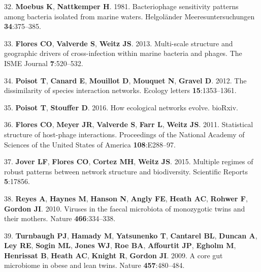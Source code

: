 \documentclass[12pt,]{article}
\begin{document}
\hypertarget{ref-Moebus:1981kp}{}
32. \textbf{Moebus K}, \textbf{Nattkemper H}. 1981. Bacteriophage
sensitivity patterns among bacteria isolated from marine waters.
Helgoländer Meeresuntersuchungen \textbf{34}:375--385.

\hypertarget{ref-Flores:2013hc}{}
33. \textbf{Flores CO}, \textbf{Valverde S}, \textbf{Weitz JS}. 2013.
Multi-scale structure and geographic drivers of cross-infection within
marine bacteria and phages. The ISME Journal \textbf{7}:520--532.

\hypertarget{ref-Poisot:2012fh}{}
34. \textbf{Poisot T}, \textbf{Canard E}, \textbf{Mouillot D},
\textbf{Mouquet N}, \textbf{Gravel D}. 2012. The dissimilarity of
species interaction networks. Ecology letters \textbf{15}:1353--1361.

\hypertarget{ref-Poisot071993}{}
35. \textbf{Poisot T}, \textbf{Stouffer D}. 2016. How ecological
networks evolve. bioRxiv.

\hypertarget{ref-Flores:2011bh}{}
36. \textbf{Flores CO}, \textbf{Meyer JR}, \textbf{Valverde S},
\textbf{Farr L}, \textbf{Weitz JS}. 2011. Statistical structure of
host-phage interactions. Proceedings of the National Academy of Sciences
of the United States of America \textbf{108}:E288--97.

\hypertarget{ref-Jover:2015ev}{}
37. \textbf{Jover LF}, \textbf{Flores CO}, \textbf{Cortez MH},
\textbf{Weitz JS}. 2015. Multiple regimes of robust patterns between
network structure and biodiversity. Scientific Reports \textbf{5}:17856.

\hypertarget{ref-Reyes:2010cwa}{}
38. \textbf{Reyes A}, \textbf{Haynes M}, \textbf{Hanson N},
\textbf{Angly FE}, \textbf{Heath AC}, \textbf{Rohwer F}, \textbf{Gordon
JI}. 2010. Viruses in the faecal microbiota of monozygotic twins and
their mothers. Nature \textbf{466}:334--338.

\hypertarget{ref-Turnbaugh:2009ei}{}
39. \textbf{Turnbaugh PJ}, \textbf{Hamady M}, \textbf{Yatsunenko T},
\textbf{Cantarel BL}, \textbf{Duncan A}, \textbf{Ley RE}, \textbf{Sogin
ML}, \textbf{Jones WJ}, \textbf{Roe BA}, \textbf{Affourtit JP},
\textbf{Egholm M}, \textbf{Henrissat B}, \textbf{Heath AC},
\textbf{Knight R}, \textbf{Gordon JI}. 2009. A core gut microbiome in
obese and lean twins. Nature \textbf{457}:480--484.
\end{document}
